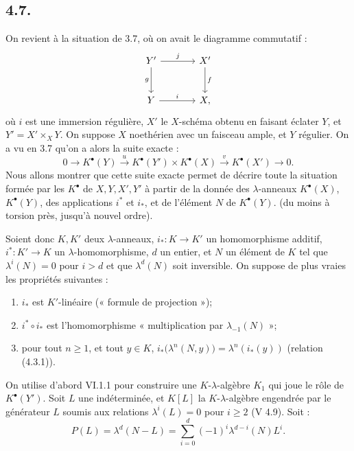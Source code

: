 
\subsection*{4.7.}

On
revient à la situation de 3.7, où on avait le diagramme commutatif :
\[
\begin{tikzcd}[column sep=large,row sep=large]
Y' \arrow[r,"j"] \arrow[d,"g"'] & X' \arrow[d,"f"]\\
Y \arrow[r,"i"] & X,
\end{tikzcd}
\]
où \(i\) est une immersion régulière, \(X'\) le \(X\)-schéma obtenu en faisant éclater \(Y\), et \(Y'=X'\times_XY\). On suppose \(X\) noethérien avec un faisceau ample, et \(Y\) régulier. On a vu en 3.7 qu'on a alors la suite exacte :
\[
0\longrightarrow K^{\bullet}(Y)\xrightarrow{u}
K^{\bullet}(Y')\times K^{\bullet}(X)\xrightarrow{v}
K^{\bullet}(X')\longrightarrow0.
\]
Nous allons montrer que cette suite exacte permet de décrire toute la situation formée par les \(K^{\bullet}\) de \(X,Y,X',Y'\) à partir de la donnée des \(\lambda\)-anneaux \(K^{\bullet}(X)\), \(K^{\bullet}(Y)\), des applications \(i^*\) et \(i_*\), et de l'élément \(N\) de \(K^{\bullet}(Y)\). (du moins à torsion près, jusqu'à nouvel ordre).

Soient donc \(K,K'\) deux \(\lambda\)-anneaux, \(i_*:K\to K'\) un homomorphisme additif, \(i^*:K'\to K\) un \(\lambda\)-homomorphisme, \(d\) un entier, et \(N\) un élément de \(K\) tel que \(\lambda^i(N)=0\) pour \(i>d\) et que \(\lambda^d(N)\) soit inversible. On suppose de plus vraies les propriétés suivantes :
\begin{enumerate}[label=\roman*)]
\item \(i_*\) est \(K'\)-linéaire (« formule de projection »);
\item \(i^*\circ i_*\) est l'homomorphisme « multiplication par \(\lambda_{-1}(N)\) »;
\item pour tout \(n\ge1\), et tout \(y\in K\), \(i_*\bigl(\lambda^n(N,y)\bigr)=\lambda^n(i_*(y))\) (relation (4.3.1)).
\end{enumerate}

On utilise d'abord VI.1.1 pour construire une \(K\)-\(\lambda\)-algèbre \(K_1\) qui joue le rôle de \(K^{\bullet}(Y')\). Soit \(L\) une indéterminée, et \(K[L]\) la \(K\)-\(\lambda\)-algèbre engendrée par le générateur \(L\) soumis aux relations \(\lambda^i(L)=0\) pour \(i\ge2\) (V 4.9). Soit :
\[
  P(L)=\lambda^d(N-L)=\sum_{i=0}^{d}(-1)^i\lambda^{d-i}(N)L^i.
\]
